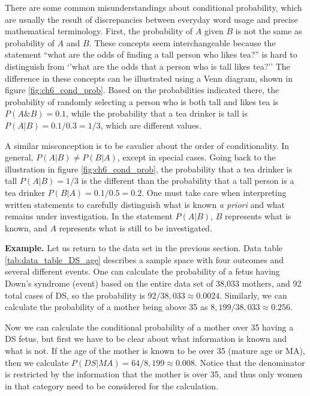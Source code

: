 \documentclass[
  letterpaper,
  DIV=11,
  numbers=noendperiod]{scrreprt}
\begin{document}
There are some common misunderstandings about conditional probability,
which are usually the result of discrepancies between everyday word
usage and precise mathematical terminology. First, the probability of
\(A\) given \(B\) is not the same as probability of \(A\) and \(B\).
These concepts seem interchangeable because the statement ``what are the
odds of finding a tall person who likes tea?'' is hard to distinguish
from `'what are the odds that a person who is tall likes tea?'' The
difference in these concepts can be illustrated using a Venn diagram,
shown in figure \ref{fig:ch6_cond_prob}. Based on the probabilities
indicated there, the probability of randomly selecting a person who is
both tall and likes tea is \(P(A \& B) = 0.1\), while the probability
that a tea drinker is tall is \(P(A | B) = 0.1/0.3 = 1/3\), which are
different values.

A similar misconception is to be cavalier about the order of
conditionality. In general, \(P(A | B) \neq P(B |A)\), except in special
cases. Going back to the illustration in figure \ref{fig:ch6_cond_prob},
the probability that a tea drinker is tall \(P(A | B) = 1/3\) is the
different than the probability that a tall person is a tea drinker
\(P(B|A) = 0.1/0.5 = 0.2\). One must take care when interpreting written
statements to carefully distinguish what is known \emph{a priori} and
what remains under investigation. In the statement \(P(A | B)\), \(B\)
represents what is known, and \(A\) represents what is still to be
investigated.

\textbf{Example.} Let us return to the data set in the previous section.
Data table \ref{tab:data_table_DS_age} describes a sample space with
four outcomes and several different events. One can calculate the
probability of a fetus having Down's syndrome (event) based on the
entire data set of 38,033 mothers, and 92 total cases of DS, so the
probability is \(92/38,033 \approx 0.0024\). Similarly, we can calculate
the probability of a mother being above 35 as
\(8,199/ 38,033 \approx 0.256\).

Now we can calculate the conditional probability of a mother over 35
having a DS fetus, but first we have to be clear about what information
is known and what is not. If the age of the mother is known to be over
35 (mature age or MA), then we calculate
\(P(DS | MA) = 64/8,199 \approx 0.008\). Notice that the denominator is
restricted by the information that the mother is over 35, and thus only
women in that category need to be considered for the calculation.
\end{document}
